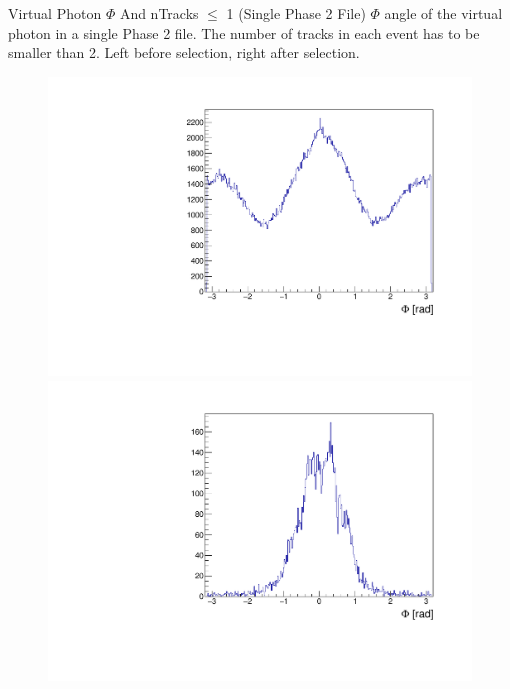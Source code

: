 \documentclass[10pt]{beamer}
\begin{document}
\begin{frame}{Virtual Photon $\Phi$ And nTracks $\leq$ 1 (Single Phase 2 File)}
	$\Phi$ angle of the virtual photon in a single Phase 2 file. The number of tracks in each event has to be smaller than 2. Left before selection, right after selection.
	
	\begin{figure}
		\centering
		\begin{minipage}{.5\textwidth}
			\centering
			\includegraphics[width=\textwidth]{gg/data/Phigg_BS_nT1}
			
		\end{minipage}%
		\begin{minipage}{.5\textwidth}
			\centering
			\includegraphics[width=\textwidth]{gg/data/Phigg_AS_nT1}
			
		\end{minipage}
	\end{figure}
	
	
	
\end{frame}
\end{document}
